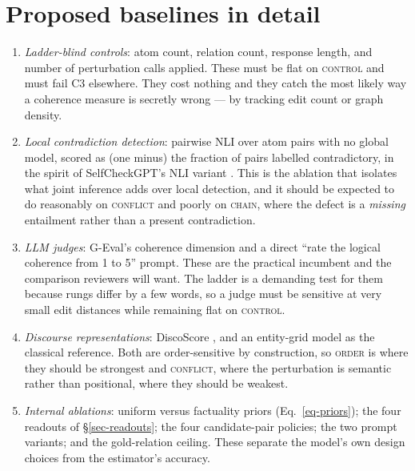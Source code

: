 \documentclass{article} %
\begin{document}
\section{Proposed baselines in detail}
\label{app-baselines}

\begin{enumerate}[leftmargin=1.6em,itemsep=1pt,topsep=2pt]
\item \emph{Ladder-blind controls}: atom count, relation count, response length, and number
  of perturbation calls applied. These must be flat on \textsc{control} and must fail C3
  elsewhere. They cost nothing and they catch the most likely way a coherence measure is
  secretly wrong --- by tracking edit count or graph density.
\item \emph{Local contradiction detection}: pairwise NLI over atom pairs with no global
  model, scored as (one minus) the fraction of pairs labelled contradictory, in the spirit of
  SelfCheckGPT's NLI variant \citep{selfcheckgpt}. This is the ablation that isolates what
  joint inference adds over local detection, and it should be expected to do reasonably on
  \textsc{conflict} and poorly on \textsc{chain}, where the defect is a \emph{missing}
  entailment rather than a present contradiction.
\item \emph{LLM judges}: G-Eval's coherence dimension \citep{geval} and a direct
  ``rate the logical coherence from 1 to 5'' prompt. These are the practical incumbent and
  the comparison reviewers will want. The ladder is a demanding test for them because rungs
  differ by a few words, so a judge must be sensitive at very small edit distances while
  remaining flat on \textsc{control}.
\item \emph{Discourse representations}: DiscoScore \citep{discoscore}, and an entity-grid
  model \citep{barzilay} as the classical reference. Both are order-sensitive by
  construction, so \textsc{order} is where they should be strongest and \textsc{conflict},
  where the perturbation is semantic rather than positional, where they should be weakest.
\item \emph{Internal ablations}: uniform versus factuality priors (Eq.~\ref{eq-priors}); the
  four readouts of \S\ref{sec-readouts}; the four candidate-pair policies; the two prompt
  variants; and the gold-relation ceiling. These separate the model's own design choices from
  the estimator's accuracy.
\end{enumerate}
\end{document}
